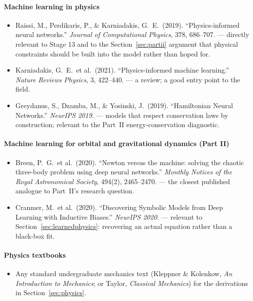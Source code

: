 \documentclass[11pt,a4paper]{article}
\begin{document}
\paragraph{Machine learning in physics}
\begin{itemize}[leftmargin=2em,itemsep=0.15em]
  \item Raissi, M., Perdikaris, P., \& Karniadakis, G.\ E.\ (2019). ``Physics-informed neural
        networks.'' \emph{Journal of Computational Physics}, 378, 686--707. --- directly relevant to
        Stage 13 and to the Section~\ref{sec:partii} argument that physical constraints should be
        built into the model rather than hoped for.
  \item Karniadakis, G.\ E.\ et al.\ (2021). ``Physics-informed machine learning.''
        \emph{Nature Reviews Physics}, 3, 422--440. --- a review; a good entry point to the field.
  \item Greydanus, S., Dzamba, M., \& Yosinski, J.\ (2019). ``Hamiltonian Neural Networks.''
        \emph{NeurIPS 2019.} --- models that respect conservation laws by construction; relevant to
        the Part~II energy-conservation diagnostic.
\end{itemize}

\paragraph{Machine learning for orbital and gravitational dynamics (Part II)}
\begin{itemize}[leftmargin=2em,itemsep=0.15em]
  \item Breen, P.\ G.\ et al.\ (2020). ``Newton versus the machine: solving the chaotic three-body
        problem using deep neural networks.'' \emph{Monthly Notices of the Royal Astronomical
        Society}, 494(2), 2465--2470. --- the closest published analogue to Part~II's research
        question.
  \item Cranmer, M.\ et al.\ (2020). ``Discovering Symbolic Models from Deep Learning with Inductive
        Biases.'' \emph{NeurIPS 2020.} --- relevant to Section~\ref{sec:learnedphysics}: recovering
        an actual equation rather than a black-box fit.
\end{itemize}

\paragraph{Physics textbooks}
\begin{itemize}[leftmargin=2em,itemsep=0.15em]
  \item Any standard undergraduate mechanics text (Kleppner \& Kolenkow, \emph{An Introduction to
        Mechanics}; or Taylor, \emph{Classical Mechanics}) for the derivations in
        Section~\ref{sec:physics}.
\end{itemize}
\end{document}
